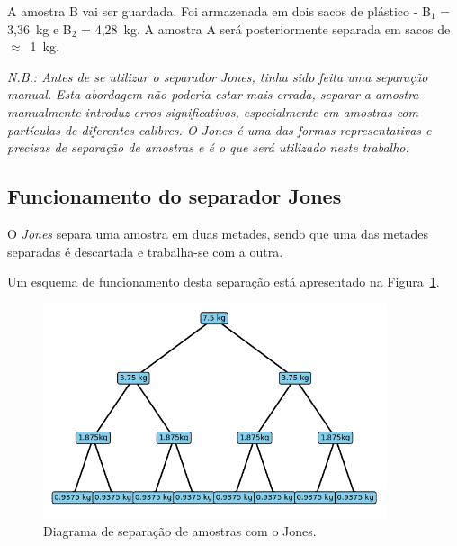 A amostra B vai ser guardada.
Foi armazenada em dois sacos de plástico - B$_1$ = 3,36~kg e B$_2$ = 4,28~kg.
A amostra A será posteriormente separada em sacos de $\approx$~1~kg.

\hrulefill
\pagebreak


\textit{N.B.: Antes de se utilizar o separador \emph{Jones}, tinha sido feita uma separação manual. Esta abordagem não poderia estar mais errada, separar a amostra manualmente introduz erros significativos, especialmente em amostras com partículas de diferentes calibres. O Jones é uma das formas representativas e precisas de separação de amostras e é o que será utilizado neste trabalho.}


\subsection{Funcionamento do separador Jones}\label{subsec:funcionamento-do-separador-jones}

O \emph{Jones} separa uma amostra em duas metades, sendo que uma das metades separadas é descartada e trabalha-se com a outra.

Um esquema de funcionamento desta separação está apresentado na Figura~\ref{fig:diagrama_jones}.

\begin{figure}[!ht]
    \centering
    \includegraphics[width=0.9\textwidth]{figures/diagrama_jones}
    \caption{Diagrama de separação de amostras com o Jones.}
    \label{fig:diagrama_jones}
\end{figure}

